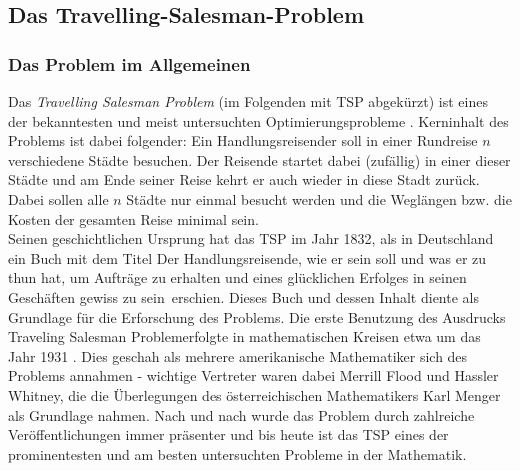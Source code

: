 \documentclass[doktyp=barbeit, sprache=german]{TUBAFarbeiten}
\begin{document}
\subsection{Das Travelling-Salesman-Problem}
\subsubsection{Das Problem im Allgemeinen}
Das \textit{Travelling Salesman Problem} (im Folgenden mit TSP abgekürzt) ist eines der bekanntesten und meist untersuchten Optimierungsprobleme \cite{TaschenbuchAlgorithmen}. Kerninhalt des Problems ist dabei folgender: Ein Handlungsreisender soll in einer Rundreise \(n\) verschiedene Städte besuchen. Der Reisende startet dabei (zufällig) in einer dieser Städte und am Ende seiner Reise kehrt er auch wieder in diese Stadt zurück. Dabei sollen alle $n$ Städte nur einmal besucht werden und die Weglängen bzw. die Kosten der gesamten Reise minimal sein.
\\Seinen geschichtlichen Ursprung hat das TSP im Jahr 1832, als in Deutschland ein Buch mit dem Titel \glqq Der Handlungsreisende, wie er sein soll und was er zu thun hat, um Aufträge zu erhalten und eines glücklichen Erfolges in seinen Geschäften gewiss zu sein\grqq\, erschien. Dieses Buch und dessen Inhalt diente als Grundlage für die Erforschung des Problems. Die erste Benutzung des Ausdrucks \glqq Traveling Salesman Problem\grqq erfolgte in mathematischen Kreisen etwa um das Jahr 1931 \cite{TSP}. 
Dies geschah als mehrere amerikanische Mathematiker sich des Problems annahmen - wichtige Vertreter waren dabei Merrill Flood und Hassler Whitney, die die Überlegungen des österreichischen Mathematikers Karl Menger als Grundlage nahmen. Nach und nach wurde das Problem durch zahlreiche Veröffentlichungen immer präsenter und bis heute ist das TSP eines der prominentesten und am besten untersuchten Probleme in der Mathematik.
\end{document}
